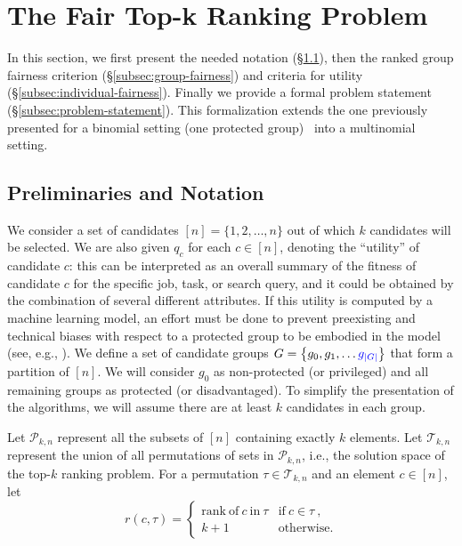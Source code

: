 
\section{The Fair Top-k Ranking Problem}\label{sec:problem}

In this section, we first present the needed notation (\S\ref{subsec:preliminaries}), then the ranked group fairness criterion (\S\ref{subsec:group-fairness}) and criteria for utility (\S\ref{subsec:individual-fairness}). Finally we provide a formal problem statement (\S\ref{subsec:problem-statement}).
%
This formalization extends the one previously presented for a binomial setting (one protected group)~\cite{zehlike2017fair} into a multinomial setting.

\subsection{Preliminaries and Notation}
\label{subsec:preliminaries}
\textcolor[rgb]{0.00,0.00,1.00}{We consider a set of candidates} $[n] = \{ 1, 2, \dots, n \}$  out of which $k$ candidates will be selected. \textcolor[rgb]{0.00,0.00,1.00}{We are also given} $q_c$ for \textcolor[rgb]{0.00,0.00,1.00}{each} $c \in [n]$, denoting the ``utility'' of candidate $c$: this can be interpreted as an overall summary of the fitness of candidate $c$ for the specific job, task, or search query, and it could be obtained by the combination of several different attributes.
If this utility is computed by a machine learning model, an effort must be done to prevent preexisting and technical biases with respect to a protected group to be embodied in the model (see, e.g., \cite{Sweeney2013}).
%
We define a set of candidate groups $G = \left\{g_0, g_1, \ldots\textcolor[rgb]{0.00,0.00,1.00}{ g_{|G|}}\right\}$ that form a partition of $[n]$. We will consider $g_0$ as non-protected (or privileged) and all remaining groups as protected (or disadvantaged).
%
To simplify the presentation of the algorithms, we will assume there are at least $k$ candidates in each group. %

Let ${\mathcal P}_{k,n}$ represent all the subsets of $[n]$ containing exactly $k$ elements.
%
Let ${\mathcal T}_{k,n}$ represent the union of all permutations of sets in ${\mathcal P}_{k,n}$, i.e., the solution space of the top-$k$ ranking problem.
%
For a permutation $\tau \in {\mathcal T}_{k,n}$ and an element $c \in [n]$, let
\[
r(c, \tau) = \begin{cases}
\mathrm{rank~of~} c \mathrm{~in~} \tau & \mathrm{if~} c \in \tau~, \\
k + 1 & \mathrm{otherwise}.
\end{cases}
\]

